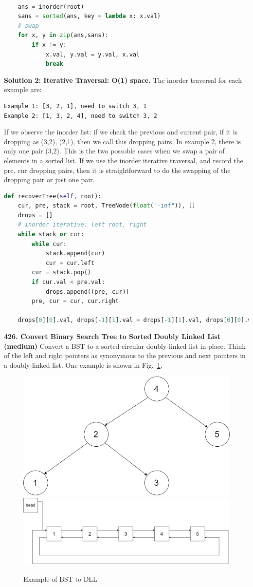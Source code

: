 \documentclass[../main.tex]{subfiles}
\begin{document}
\begin{examples}[resume]
\begin{lstlisting}[language=Python]
    
    ans = inorder(root)
    sans = sorted(ans, key = lambda x: x.val)
    # swap 
    for x, y in zip(ans,sans):
        if x != y:
            x.val, y.val = y.val, x.val
            break
\end{lstlisting}
\textbf{Solution 2: Iterative Traversal: O(1) space.} The inorder traversal for each example are:
\begin{lstlisting}[numbers=none]
Example 1: [3, 2, 1], need to switch 3, 1
Example 2: [1, 3, 2, 4], need to switch 3, 2
\end{lstlisting}
If we observe the inorder list: if we check the previous and current pair, if it is dropping as (3,2), (2,1), then we call this dropping pairs. In example 2, there is only one pair (3,2). This is the two possoble cases when we swap a pair of elements  in a sorted list. If we use the inorder iterative traversal, and record the pre, cur dropping pairs, then it is straightforward to do the swapping of the dropping pair or just one pair. 
\begin{lstlisting}[language=Python]
def recoverTree(self, root):
    cur, pre, stack = root, TreeNode(float("-inf")), []
    drops = []
    # inorder iterative: left root, right
    while stack or cur: 
        while cur:
            stack.append(cur)
            cur = cur.left
        cur = stack.pop()
        if cur.val < pre.val:
            drops.append((pre, cur))
        pre, cur = cur, cur.right

    drops[0][0].val, drops[-1][1].val = drops[-1][1].val, drops[0][0].val
\end{lstlisting}
\item \textbf{426. Convert Binary Search Tree to Sorted Doubly Linked List (medium)} Convert a BST to a sorted circular doubly-linked list in-place. Think of the left and right pointers as synonymous to the previous and next pointers in a doubly-linked list. One example is shown in Fig.~\ref{fig:bst_dll}. 
\begin{figure}[h!]
    \centering
    \includegraphics[width=0.45\columnwidth]{fig/bstdlloriginalbst.png}
    \includegraphics[width=0.45\columnwidth]{fig/bstdllreturndll.png}
    \caption{Example of BST to DLL}
    \label{fig:bst_dll}
\end{figure}


\end{examples}
\end{document}
